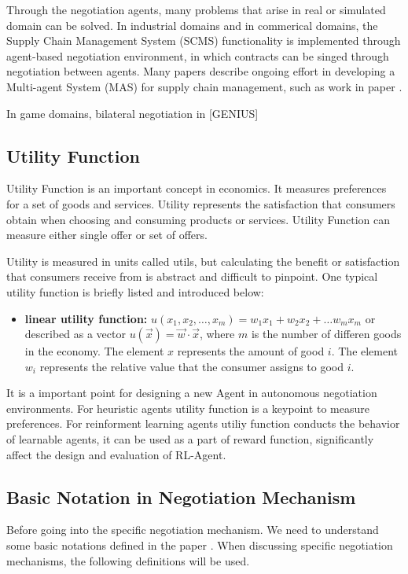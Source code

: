 Through the negotiation agents, many problems that arise in real or simulated domain can be solved. In industrial domains and in commerical domains, the Supply Chain Management System (SCMS) functionality is implemented through agent-based negotiation environment, in which contracts can be singed through negotiation between agents. Many papers describe ongoing effort in developing a Multi-agent System (MAS) for supply chain management, such as work in paper \parencite{Lee2004}.

In game domains, bilateral negotiation in [GENIUS]

\subsection{Utility Function}
Utility Function is an important concept in economics. It measures preferences for a set of goods and services. Utility represents the satisfaction that consumers obtain when choosing and consuming products or services\parencite{ANDRIY2019}. Utility Function can measure either single offer or set of offers.

Utility is measured in units called utils, but calculating the benefit or satisfaction that consumers receive from is abstract and difficult to pinpoint\parencite{ANDRIY2019}. One typical utility function is briefly listed and introduced below:

\begin{itemize}
\item \textbf{linear utility function:} $u\left(x_{1}, x_{2}, \ldots, x_{m}\right)=w_{1} x_{1}+w_{2} x_{2}+\ldots w_{m} x_{m}$ or described as a vector $u(\vec{x})=\vec{w} \cdot \vec{x}$, where $m$ is the number of differen goods in the economy. The element $x$ represents the amount of good $i$. The element $w_i$ represents the relative value that the consumer assigns to good $i$.
\end{itemize}

It is a important point for designing a new Agent in autonomous negotiation environments. For heuristic agents utility function is a keypoint to measure preferences. For reinforment learning agents utiliy function conducts the behavior of learnable agents, it can be used as a part of reward function, significantly affect the design and evaluation of RL-Agent.

\subsection{Basic Notation in Negotiation Mechanism}
Before going into the specific negotiation mechanism. We need to understand some basic notations defined in the paper \parencite{Aydoğan2017}.
When discussing specific negotiation mechanisms, the following definitions will be used.

